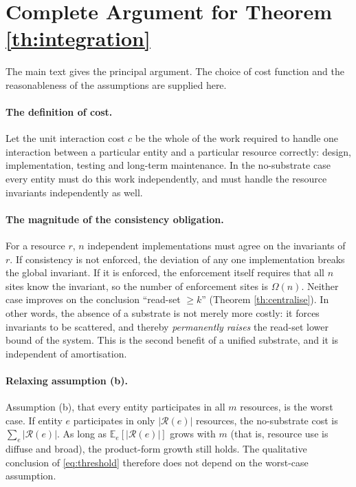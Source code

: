 \section{Complete Argument for Theorem \ref{th:integration}}

The main text gives the principal argument. The choice of cost function and the
reasonableness of the assumptions are supplied here.

\paragraph{The definition of cost.}
Let the unit interaction cost $c$ be the whole of the work required to handle one
interaction between a particular entity and a particular resource correctly: design,
implementation, testing and long-term maintenance. In the no-substrate case every entity
must do this work independently, and must handle the resource invariants independently as
well.

\paragraph{The magnitude of the consistency obligation.}
For a resource $r$, $n$ independent implementations must agree on the invariants of $r$.
If consistency is not enforced, the deviation of any one implementation breaks the global
invariant. If it is enforced, the enforcement itself requires that all $n$ sites know the
invariant, so the number of enforcement sites is $\Omega(n)$. Neither case improves on the
conclusion ``read-set $\ge k$'' (Theorem \ref{th:centralise}). In other words, the absence
of a substrate is not merely more costly: it forces invariants to be scattered, and
thereby \emph{permanently raises} the read-set lower bound of the system. This is the
second benefit of a unified substrate, and it is independent of amortisation.

\paragraph{Relaxing assumption (b).}
Assumption (b), that every entity participates in all $m$ resources, is the worst case. If
entity $e$ participates in only $|\mathcal{R}(e)|$ resources, the no-substrate cost is
$\sum_e |\mathcal{R}(e)|$. As long as $\mathbb{E}_e[|\mathcal{R}(e)|]$ grows with $m$
(that is, resource use is diffuse and broad), the product-form growth still holds. The
qualitative conclusion of \eqref{eq:threshold} therefore does not depend on the worst-case
assumption.

